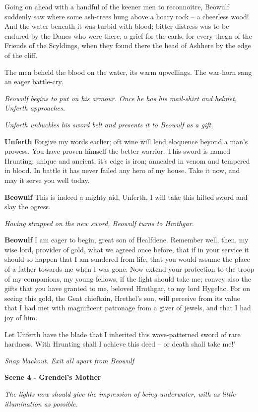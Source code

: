 \documentclass[a4paper]{article}
\begin{document}
{Going on ahead with a handful of the
keener men to reconnoitre,
Beowulf suddenly saw where some ash-trees
hung above a hoary rock
– a cheerless wood! And the water beneath it
was turbid with blood; bitter distress
was to be endured by the Danes who were there,
a grief for the earls, for every thegn
of the Friends of the Scyldings, when they found there
the head of Ashhere by the edge of the cliff.

The men beheld the blood on the water,
its warm upwellings. The war-horn sang
an eager battle-cry.

\centerline{\textit{Beowulf begins to put on his armour. Once he has his mail-shirt and helmet, Unferth approaches.}}
\centerline{\textit{Unferth unbuckles his sword belt and presents it to Beowulf as a gift.}}

\textbf{Unferth} Forgive my words earlier;
oft wine will lend eloquence beyond a man's prowess.
You have proven himself the better warrior.
This sword is named Hrunting; unique and ancient,
it's edge is iron; annealed in venom and tempered in blood.
In battle it has never failed any hero of my house.
Take it now, and may it serve you well today. 

\textbf{Beowulf} This is indeed a mighty aid, Unferth.
I will take this hilted sword and slay the ogress.

\centerline{\textit{Having strapped on the new sword, Beowulf turns to Hrothgar.}}

\textbf{Beowulf} I am eager to begin, great son of Healfdene.
Remember well, then, my wise lord,
provider of gold, what we agreed once before,
that if in your service it should so happen
that I am sundered from life, that you would assume the place
of a father towards me when I was gone.
Now extend your protection to the troop of my companions,
my young fellows, if the fight should take me;
convey also the gifts that you have granted to me,
beloved Hrothgar, to my lord Hygelac.
For on seeing this gold, the Geat chieftain,
Hrethel’s son, will perceive from its value
that I had met with magnificent patronage
from a giver of jewels, and that I had joy of him.

Let Unferth have the blade that I inherited
this wave-patterned sword
of rare hardness. With Hrunting shall I
achieve this deed – or death shall take me!’

\centerline{\textit{Snap blackout. Exit all apart from Beowulf}}

\centerline{\textbf{Scene 4 - Grendel's Mother}}

\centerline{\textit{The lights now should give the impression of being underwater, with as little illumination as possible.}}

}
\end{document}
